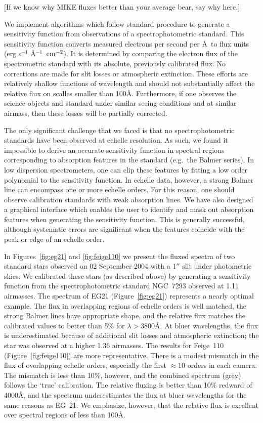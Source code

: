 \documentclass[12pt,preprint]{aastex}
\begin{document}
[If we know why MIKE fluxes better than your average bear, say
why here.]

We implement algorithms which follow standard procedure to 
generate a sensitivity function from observations of a spectrophotometric
standard.  This sensitivity function converts measured electrons per
second per \AA\ to flux units (erg s$^{-1}$ \AA$^{-1}$ $\, {\rm cm^{-2}}$).
It is determined by comparing the electron flux of the spectrometric
standard with its absolute, previously calibrated flux.
No corrections are made for slit losses or atmospheric extinction.
These efforts are relatively shallow functions of wavelength and should
not substantially affect the relative flux on scalles smaller than 100\AA.
Furthermore,
if one observes the science objects and standard under similar seeing
conditions and at similar airmass, then these losses will be 
partially corrected.

The only significant challenge that we faced is that no spectrophotometric
standards have been observed at echelle resolution.  
As such, we found it impossible to derive an accurate sensitivity 
function in spectral regions corresponding to
absorption features in the standard (e.g.\ the Balmer series).
In low dispersion spectrometers, one can clip these features
by fitting a low order polynomial to the sensitivity function. 
In echelle data, however, a strong Balmer
line can encompass one or more echelle orders.   For this reason,
one should observe calibration standards with weak
absorption lines.  We have also designed a graphical interface
which enables the user to identify and mask out absorption features
when generating the sensitivity function.  This is generally 
successful, although systematic errors are significant when the
features coincide with the peak or edge of an echelle order.

In Figures~\ref{fig:eg21} and \ref{fig:feige110}
we present the fluxed spectra of two standard stars observed
on 02 September 2004 with a 1$''$ slit under photometric skies.
We calibrated these stars (as described above) by generating
a sensitivity function from the spectrophotometric standard
NGC~7293 observed at 1.11 airmasses.
The spectrum of EG21 (Figure~\ref{fig:eg21}) represents
a nearly optimal example.  The flux in overlapping regions of
echelle orders is well matched, the strong Balmer lines have 
appropriate shape, and the relative flux matches the 
calibrated values \citep{hamuy94} to better than 5$\%$ for
$\lambda > 3800$\AA.  At bluer wavelengths, the flux is underestimated
because of additional slit losses and atmospheric 
extinction;  the star was observed at a higher 1.36 airmasses.
The results for Feige~110 (Figure~\ref{fig:feige110}) are more
representative.  There is a modest mismatch
in the flux of overlapping echelle orders, especially the
first $\approx 10$ orders in each camera.  The mismatch is less
than 10$\%$, however, and the combined spectrum (grey) follows
the `true' calibration.  The relative fluxing is better than 10$\%$
redward of 4000\AA, and the spectrum underestimates the
flux at bluer wavelengths for the same reasons as EG~21.
We emphasize, however, that the relative flux is excellent over
spectral regions of less than 100\AA.
\end{document}
